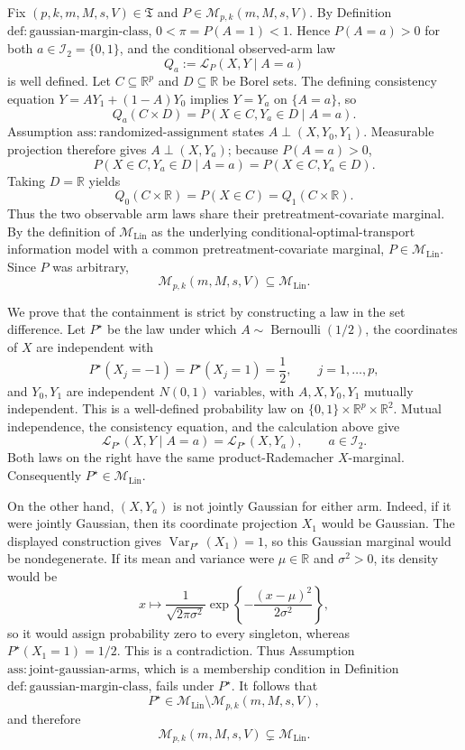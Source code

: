 Fix \((p,k,m,M,s,V)\in\mathfrak T\) and
\(P\in\mathcal M_{p,k}(m,M,s,V)\).  By Definition
\(\mathrm{def{:}gaussian\text{-}margin\text{-}class}\),
\(0<\pi=P(A=1)<1\).  Hence \(P(A=a)>0\) for both
\(a\in\mathcal I_2=\{0,1\}\), and the conditional observed-arm law
\[
Q_a:=\mathcal L_P(X,Y\mid A=a)
\]
is well defined.  Let \(C\subseteq\mathbb R^p\) and
\(D\subseteq\mathbb R\) be Borel sets.  The defining consistency equation
\(Y=AY_1+(1-A)Y_0\) implies \(Y=Y_a\) on \(\{A=a\}\), so
\[
Q_a(C\times D)
=P(X\in C,Y_a\in D\mid A=a).
\]
Assumption \(\mathrm{ass{:}randomized\text{-}assignment}\) states
\(A\perp(X,Y_0,Y_1)\).  Measurable projection therefore gives
\(A\perp(X,Y_a)\); because \(P(A=a)>0\),
\[
P(X\in C,Y_a\in D\mid A=a)
=P(X\in C,Y_a\in D).
\]
Taking \(D=\mathbb R\) yields
\[
Q_0(C\times\mathbb R)
=P(X\in C)
=Q_1(C\times\mathbb R).
\]
Thus the two observable arm laws share their pretreatment-covariate
marginal.  By the definition of \(\mathcal M_{\mathrm{Lin}}\) as the
underlying conditional-optimal-transport information model with a common
pretreatment-covariate marginal, \(P\in\mathcal M_{\mathrm{Lin}}\).
Since \(P\) was arbitrary,
\[
\mathcal M_{p,k}(m,M,s,V)\subseteq\mathcal M_{\mathrm{Lin}}.
\]

We prove that the containment is strict by constructing a law in the
set difference.  Let \(P^\star\) be the law under which
\(A\sim\operatorname{Bernoulli}(1/2)\), the coordinates of \(X\) are
independent with
\[
P^\star(X_j=-1)=P^\star(X_j=1)=\frac12,
\qquad j=1,\ldots,p,
\]
and \(Y_0,Y_1\) are independent \(N(0,1)\) variables, with
\(A,X,Y_0,Y_1\) mutually independent.  This is a well-defined probability
law on \(\{0,1\}\times\mathbb R^p\times\mathbb R^2\).  Mutual independence,
the consistency equation, and the calculation above give
\[
\mathcal L_{P^\star}(X,Y\mid A=a)
=\mathcal L_{P^\star}(X,Y_a),
\qquad a\in\mathcal I_2.
\]
Both laws on the right have the same product-Rademacher \(X\)-marginal.
Consequently \(P^\star\in\mathcal M_{\mathrm{Lin}}\).

On the other hand, \((X,Y_a)\) is not jointly Gaussian for either arm.
Indeed, if it were jointly Gaussian, then its coordinate projection
\(X_1\) would be Gaussian.  The displayed construction gives
\(\operatorname{Var}_{P^\star}(X_1)=1\), so this Gaussian marginal would
be nondegenerate.  If its mean and variance were \(\mu\in\mathbb R\) and
\(\sigma^2>0\), its density would be
\[
x\longmapsto
\frac{1}{\sqrt{2\pi\sigma^2}}
\exp\!\left\{-\frac{(x-\mu)^2}{2\sigma^2}\right\},
\]
so it would assign probability zero to every singleton, whereas
\(P^\star(X_1=1)=1/2\).  This is a contradiction.  Thus
Assumption \(\mathrm{ass{:}joint\text{-}gaussian\text{-}arms}\), which is
a membership condition in Definition
\(\mathrm{def{:}gaussian\text{-}margin\text{-}class}\), fails under
\(P^\star\).  It follows that
\[
P^\star\in
\mathcal M_{\mathrm{Lin}}\setminus
\mathcal M_{p,k}(m,M,s,V),
\]
and therefore
\[
\mathcal M_{p,k}(m,M,s,V)\subsetneq\mathcal M_{\mathrm{Lin}}.
\]

